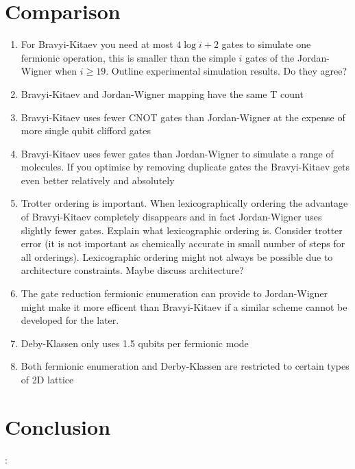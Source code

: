 \documentclass[twoside]{article}
\begin{document}
\section{Comparison}
\begin{enumerate}
        \item For Bravyi-Kitaev you need at most $4 \log i +2$ gates to simulate one fermionic operation, this is smaller than the simple $i$ gates of the Jordan-Wigner when $i \geq 19$. Outline experimental simulation results. Do they agree?
        \item Bravyi-Kitaev and Jordan-Wigner mapping have the same T count
        \item Bravyi-Kitaev uses fewer CNOT gates than Jordan-Wigner at the expense of more single qubit clifford gates
        \item Bravyi-Kitaev uses fewer gates than Jordan-Wigner to simulate a range of molecules. If you optimise by removing duplicate gates the Bravyi-Kitaev gets even better relatively and absolutely
        \item Trotter ordering is important. When lexicographically ordering the advantage of Bravyi-Kitaev completely disappears and in fact Jordan-Wigner uses slightly fewer gates. Explain what lexicographic ordering is. Consider trotter error (it is not important as chemically accurate in small number of steps for all orderings). Lexicographic ordering might not always be possible due to architecture constraints. Maybe discuss architecture?
        \item The gate reduction fermionic enumeration can provide to Jordan-Wigner might make it more efficent than Bravyi-Kitaev if a similar scheme cannot be developed for the later.
        \item Deby-Klassen only uses 1.5 qubits per fermionic mode 
        \item Both fermionic enumeration and Derby-Klassen are restricted to certain types of 2D lattice
\end{enumerate}
\section{Conclusion}:
\end{document}
